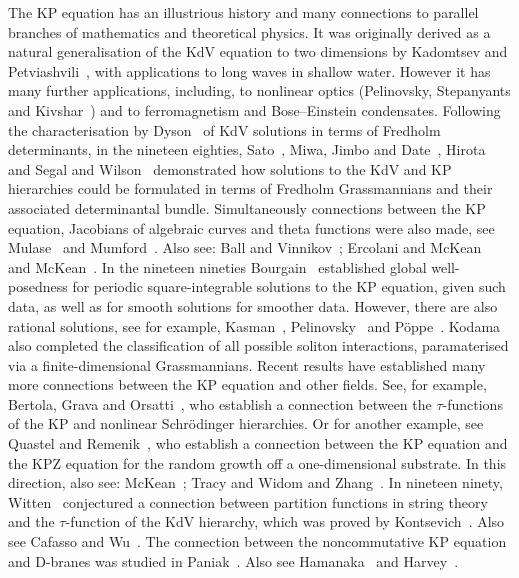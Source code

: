 \documentclass[5p,twocolumn]{elsarticle}
\begin{document}
The KP equation has an illustrious history and many connections to parallel branches of mathematics and theoretical physics.
It was originally derived as a natural generalisation of the KdV equation to two dimensions by Kadomtsev and Petviashvili~\cite{KadomtsevPetviashvili}, with applications to long waves in shallow water.
However it has many further applications, including, to nonlinear optics (Pelinovsky, Stepanyants and Kivshar~\cite{PSK}) and to ferromagnetism and Bose--Einstein condensates.
Following the characterisation by Dyson~\cite{Dyson} of KdV solutions in terms of Fredholm determinants, in the nineteen eighties,
Sato~\cite{SatoI,SatoII}, Miwa, Jimbo and Date~\cite{MJD}, Hirota~\cite{Hirota} and Segal and Wilson~\cite{SW} demonstrated how solutions to the KdV and KP hierarchies 
could be formulated in terms of Fredholm Grassmannians and their associated determinantal bundle.
Simultaneously connections between the KP equation, Jacobians of algebraic curves and theta functions were also made, see Mulase~\cite{Mu94} and Mumford~\cite{Mumford}.
Also see: Ball and Vinnikov~\cite{BV}; Ercolani and McKean~\cite{EM} and McKean~\cite{Mc87}.
In the nineteen nineties Bourgain~\cite{Bourgain} established global well-posedness for periodic square-integrable solutions to the KP equation, given such data, as well as for smooth solutions for smoother data.
However, there are also rational solutions, see for example, Kasman~\cite{Kasman}, Pelinovsky~\cite{Pelinovsky} and P\"oppe~\cite{PKP}.
Kodama~\cite{Kodama} also completed the classification of all possible soliton interactions, paramaterised via a finite-dimensional Grassmannians. 
Recent results have established many more connections between the KP equation and other fields.
See, for example, Bertola, Grava and Orsatti~\cite{BGO}, who establish a connection between the $\tau$-functions of the KP and nonlinear Schr\"odinger hierarchies.
Or for another example, see Quastel and Remenik~\cite{QR}, who establish a connection between the KP equation and the KPZ equation for the random growth off a one-dimensional substrate.
In this direction, also see: McKean~\cite{McKean11}; Tracy and Widom \cite{TW94,TW96,TW03} and Zhang~\cite{Zhang}. 
In nineteen ninety, Witten~\cite{Witten} conjectured a connection between partition functions in string theory and the $\tau$-function of the KdV hierarchy, which was proved by Kontsevich~\cite{Kontsevich}.
Also see Cafasso and Wu~\cite{CafassoWu}. The connection between the noncommutative KP equation and D-branes was studied in Paniak~\cite{Paniak}. 
Also see Hamanaka~\cite{Hamanaka06,Hamanaka} and Harvey~\cite{Harvey}.
\end{document}
